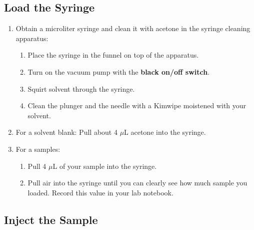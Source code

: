 \documentclass[]{tufte-book}
\providecommand{\tightlist}{%
  \setlength{\itemsep}{0pt}\setlength{\parskip}{0pt}}
\begin{document}
\hypertarget{load-the-syringe}{%
\subsection{Load the Syringe}\label{load-the-syringe}}

\begin{enumerate}
\def\labelenumi{\arabic{enumi}.}
\tightlist
\item
  Obtain a microliter syringe and clean it with acetone in the syringe cleaning apparatus:

  \begin{enumerate}
  \def\labelenumii{\arabic{enumii}.}
  \tightlist
  \item
    Place the syringe in the funnel on top of the apparatus.\\
  \item
    Turn on the vacuum pump with the \textbf{black on/off switch}.\\
  \item
    Squirt solvent through the syringe.\\
  \item
    Clean the plunger and the needle with a Kimwipe moistened with your solvent.\\
  \end{enumerate}
\item
  For a solvent blank: Pull about 4 \(\mu\)L acetone into the syringe.\\
\item
  For a samples:

  \begin{enumerate}
  \def\labelenumii{\arabic{enumii}.}
  \tightlist
  \item
    Pull 4 \(\mu\)L of your sample into the syringe.
  \item
    Pull air into the syringe until you can clearly see how much sample you loaded. Record this value in your lab notebook.
  \end{enumerate}
\end{enumerate}

\hypertarget{inject-the-sample}{%
\subsection{Inject the Sample}\label{inject-the-sample}}
\end{document}
